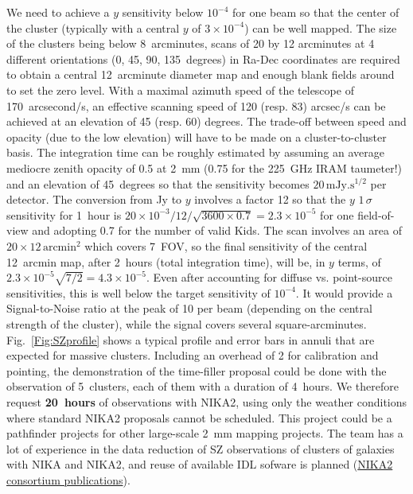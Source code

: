 \documentclass[10pt,a4paper,twoside,graphicx,color]{article}
\begin{document}
We need to achieve a $y$ sensitivity below $10^{-4}$ for one beam so
that the center of the cluster (typically with a central $y$ of
$3\times 10^{-4}$) can be well mapped. The size of the clusters being
below 8~arcminutes, scans of 20 by 12 arcminutes at 4 different
orientations (0, 45, 90, 135~degrees) in Ra-Dec coordinates are
required to obtain a central 12~arcminute diameter map and enough
blank fields around to set the zero level. With a maximal azimuth
speed of the telescope of 170~arcsecond/s, an effective scanning speed
of 120 (resp. 83) arcsec/s can be achieved at an elevation of 45
(resp. 60) degrees. The trade-off between speed and opacity (due to
the low elevation) will have to be made on a cluster-to-cluster
basis. The integration time can be roughly estimated by assuming an
average mediocre zenith opacity of 0.5 at 2~mm (0.75 for the 225~GHz
IRAM taumeter!) and an elevation of 45~degrees so that the sensitivity
becomes $20\,\mathrm{mJy.s^{1/2}}$ per detector. The conversion from
Jy to $y$ involves a factor 12 so that the $y$ $1\,\sigma$ sensitivity
for 1~hour is $20\times 10^{-3}/12/\sqrt{3600\times 0.7}=2.3\times
10^{-5}$ for one field-of-view and adopting 0.7 for the number of
valid Kids. The scan involves an area of $20\times
12\,\mathrm{arcmin^2}$ which covers 7~FOV, so the final sensitivity of
the central 12~arcmin map, after 2~hours (total integration time),
will be, in $y$ terms, of $2.3\times 10^{-5}\sqrt{7/2}=4.3\times
10^{-5}$. Even after accounting for diffuse vs. point-source
sensitivities, this is well below the target sensitivity of
$10^{-4}$. It would provide a Signal-to-Noise ratio at the peak of 10
per beam (depending on the central strength of the cluster), while the
signal covers several square-arcminutes. Fig.~\ref{Fig:SZprofile}
shows a typical profile and error bars in annuli that are expected for
massive clusters. Including an overhead of 2 for calibration and
pointing, the demonstration of the time-filler proposal could be done
with the observation of 5~clusters, each of them with a duration of
4~hours. We therefore request {\bf 20~hours} of observations with
NIKA2, using only the weather conditions where standard NIKA2
proposals cannot be scheduled. This project could be a pathfinder
projects for other large-scale 2~mm mapping projects. The team has a
lot of experience in the data reduction of SZ observations of clusters
of galaxies with NIKA and NIKA2, and reuse of available IDL sofware is
planned (\href{https://ipag.osug.fr/nika2/Publications.html}{NIKA2 consortium publications}).
\end{document}
